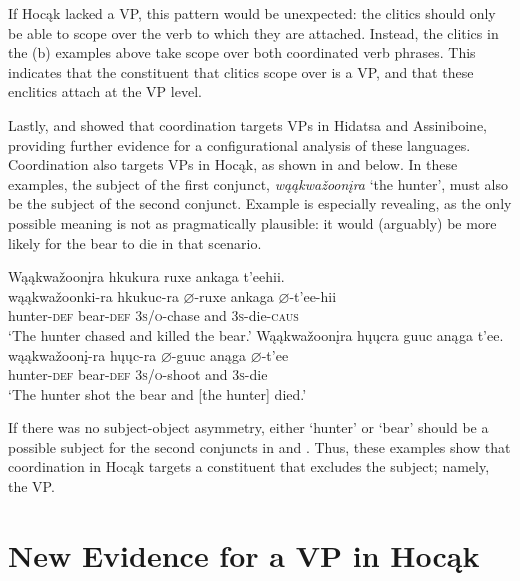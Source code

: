 \documentclass[output=paper]{LSP/langsci}
\begin{document}
If Hocąk lacked a VP, this pattern would be unexpected: the clitics should only be able to scope over the verb to which they are attached. Instead, the clitics in the (b) examples above take scope over both coordinated verb phrases. This indicates that the constituent that clitics scope over is a VP, and that these enclitics attach at the VP level. 
	
Lastly, \citet{Boyle2007} and \citet{West2003} showed that coordination targets VPs in Hidatsa and Assiniboine, providing further evidence for a configurational analysis of these languages.  Coordination also targets VPs in Hocąk, as shown in  and  below. In these examples, the subject of the first conjunct, \textit{wąąkwa\v{z}oon\k{i}ra} `the hunter', must also be the subject of the second conjunct.  Example  is especially revealing, as the only possible meaning is not as pragmatically plausible: it would (arguably) be more likely for the bear to die in that scenario.

\begin{exe}
\ex\label{ex:jrs:35} 
\glll Wąąkwa\v{z}oon\k{i}ra 		hk{u}k{u}ra 			ruxe 				ank{a}ga 	t'eehii. \\
wąąkwa\v{z}oonk{i}-ra 	hk{u}k{u}c-ra 		$\varnothing$-ruxe  		ank{a}ga 	$\varnothing$-t'ee-hii \\
hunter-\textsc{def} 					bear-\textsc{def} 	\textsc{3s/o}-chase and 		\textsc{3s}-die-\textsc{caus} \\
\trans`The hunter chased and killed the bear.'
  \ex\label{ex:jrs:36} 
\glll Wąąkwa\v{z}oon\k{i}ra 		h\k{u}\k{u}cra 		guuc 				anąga 	t'ee. \\
wąąkwa\v{z}oon\k{i}-ra 	h\k{u}\k{u}c-ra 		$\varnothing$-guuc 			anąga 	$\varnothing$-t'ee \\
hunter-\textsc{def} 		bear-\textsc{def} 	\textsc{3s/o}-shoot 		and 		\textsc{3s}-die \\
\trans `The hunter shot the bear and [the hunter] died.'
\end{exe}
	
If there was no subject-object asymmetry, either `hunter' or `bear' should be a possible subject for the second conjuncts in  and . Thus, these examples show that coordination in Hocąk targets a constituent that excludes the subject; namely, the VP.

\section{New Evidence for a VP in Hocąk}\label{sec:jrs:4}
\end{document}
